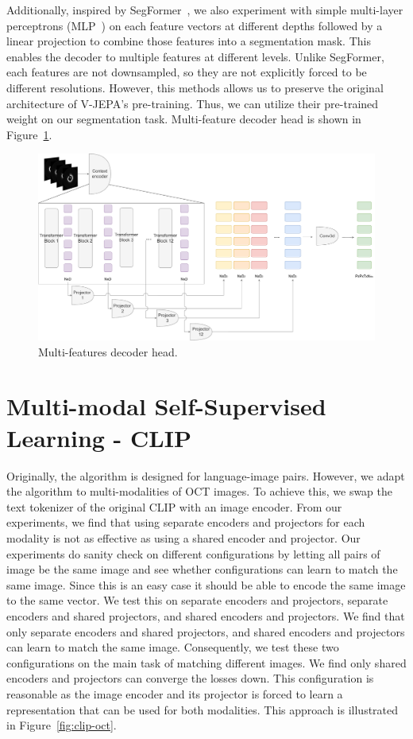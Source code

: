 \documentclass[a4paper,11pt,oneside]{report}
\begin{document}
Additionally, inspired by SegFormer~\cite{Xie2021SegFormer}, we also experiment with simple multi-layer perceptrons (MLP~\cite{Rumelhart1986}) on each feature vectors at different depths followed by a linear projection to combine those features into a segmentation mask. This enables the decoder to multiple features at different levels. Unlike SegFormer, each features are not downsampled, so they are not explicitly forced to be different resolutions. However, this methods allows us to preserve the original architecture of V-JEPA's pre-training. Thus, we can utilize their pre-trained weight on our segmentation task. Multi-feature decoder head is shown in Figure~\ref{fig:vjepa-multi-feature-decoder-head}.

\begin{figure}[ht]
    \centering
    \includegraphics[width=1.0\linewidth]{figures/fig_implementation_vjepa_multifeat.pdf}
    \caption{Multi-features decoder head.}
    \label{fig:vjepa-multi-feature-decoder-head}
\end{figure}

\section{Multi-modal Self-Supervised Learning - CLIP}\label{sec:implementation:clip}
Originally, the algorithm is designed for language-image pairs. However, we adapt the algorithm to multi-modalities of OCT images. To achieve this, we swap the text tokenizer of the original CLIP with an image encoder. From our experiments, we find that using separate encoders and projectors for each modality is not as effective as using a shared encoder and projector. Our experiments do sanity check on different configurations by letting all pairs of image be the same image and see whether configurations can learn to match the same image. Since this is an easy case it should be able to encode the same image to the same vector. We test this on separate encoders and projectors, separate encoders and shared projectors, and shared encoders and projectors. We find that only separate encoders and shared projectors, and shared encoders and projectors can learn to match the same image. Consequently, we test these two configurations on the main task of matching different images. We find only shared encoders and projectors can converge the losses down. This configuration is reasonable as the image encoder and its projector is forced to learn a representation that can be used for both modalities. This approach is illustrated in Figure~\ref{fig:clip-oct}.
\end{document}
